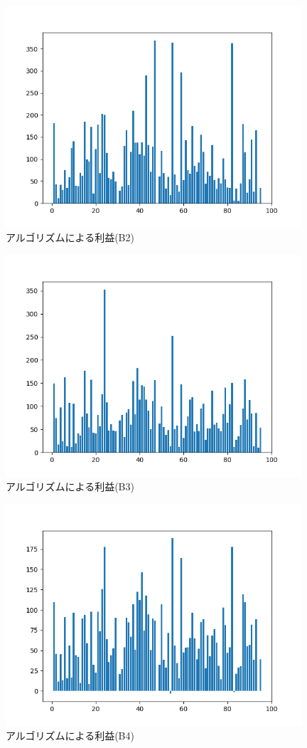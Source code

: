  \begin{figure}[H]
  \centering
  \includegraphics[width=110mm]{fig/macd_fma_saiteki.png}
  \caption{アルゴリズムによる利益(B2)}
  \label{fig:macdfmasai}
 \end{figure}

 \begin{figure}[H]
  \centering
  \includegraphics[width=110mm]{fig/macd_nikkei_saiteki.png}
  \caption{アルゴリズムによる利益(B3)}
  \label{fig:macdnikkeisai}
 \end{figure}

 \begin{figure}[H]
  \centering
  \includegraphics[width=110mm]{fig/macd_nikkeiandfma_saiteki.png}
  \caption{アルゴリズムによる利益(B4)}
  \label{fig:b4sai}
 \end{figure}

